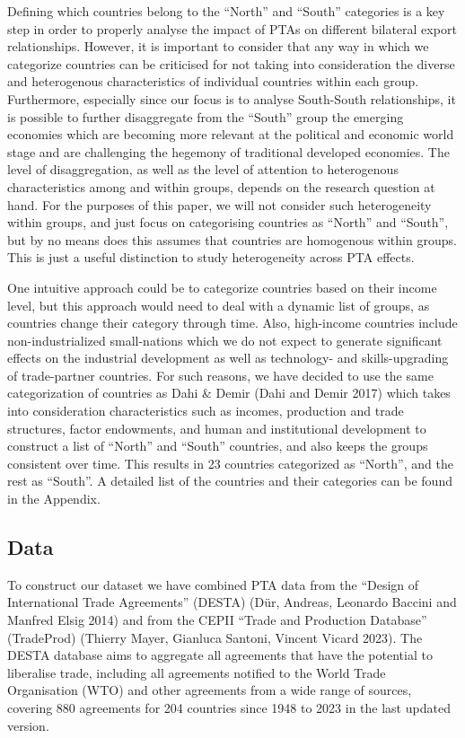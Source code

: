 \documentclass[12pt]{article}%
\begin{document}
%
Defining which countries belong to the ``North'' and ``South''
categories is a key step in order to properly analyse the impact of PTAs
on different bilateral export relationships. However, it is important to
consider that any way in which we categorize countries can be criticised
for not taking into consideration the diverse and heterogenous
characteristics of individual countries within each group. Furthermore,
especially since our focus is to analyse South-South relationships, it
is possible to further disaggregate from the ``South'' group the
emerging economies which are becoming more relevant at the political and
economic world stage and are challenging the hegemony of traditional
developed economies. The level of disaggregation, as well as the level
of attention to heterogenous characteristics among and within groups,
depends on the research question at hand. For the purposes of this
paper, we will not consider such heterogeneity within groups, and just
focus on categorising countries as ``North'' and ``South'', but by no
means does this assumes that countries are homogenous within groups.
This is just a useful distinction to study heterogeneity across PTA
effects.

One intuitive approach could be to categorize countries based on their
income level, but this approach would need to deal with a dynamic list
of groups, as countries change their category through time. Also,
high-income countries include non-industrialized small-nations which we
do not expect to generate significant effects on the industrial
development as well as technology- and skills-upgrading of trade-partner
countries. For such reasons, we have decided to use the same
categorization of countries as Dahi \& Demir (Dahi and Demir 2017) which
takes into consideration characteristics such as incomes, production and
trade structures, factor endowments, and human and institutional
development to construct a list of ``North'' and ``South'' countries,
and also keeps the groups consistent over time. This results in 23
countries categorized as ``North'', and the rest as ``South''. A
detailed list of the countries and their categories can be found in the
Appendix.%
\subsection{Data}%
\label{subsec:Data}%

%
To construct our dataset we have combined PTA data from the ``Design of
International Trade Agreements'' (DESTA) (Dür, Andreas, Leonardo Baccini
and Manfred Elsig 2014) and from the CEPII ``Trade and Production
Database'' (TradeProd) (Thierry Mayer, Gianluca Santoni, Vincent Vicard
2023). The DESTA database aims to aggregate all agreements that have the
potential to liberalise trade, including all agreements notified to the
World Trade Organisation (WTO) and other agreements from a wide range of
sources, covering 880 agreements for 204 countries since 1948 to 2023 in
the last updated version.
\end{document}
